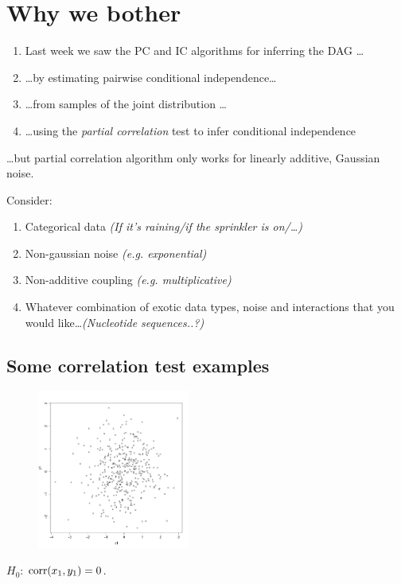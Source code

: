 \clearpage

\section{Why we bother}

\begin{enumerate}
	\item Last week we saw the PC and IC algorithms for inferring the DAG \ldots 
	\item \ldots by estimating pairwise conditional independence\ldots
	\item \ldots from samples of the joint distribution \ldots
	\item \ldots using the \emph{partial correlation} test to infer conditional independence
\end{enumerate}
\clearpage
\dots but partial correlation algorithm only works for linearly additive, Gaussian noise.
\clearpage

Consider:
\begin{enumerate}
\item Categorical data \emph{(If it's raining/if the sprinkler is on/\ldots)}
\item Non-gaussian noise \emph{(e.g. exponential)}
\item Non-additive coupling \emph{(e.g. multiplicative)}
\item Whatever combination of exotic data types, noise and interactions that you would like\dots \emph{(Nucleotide sequences..?)}
\end{enumerate}
\clearpage
\subsection*{Some correlation test examples}
\clearpage
\begin{figure}
  \begin{center}
    \includegraphics[width=5cm]{x1_vs_y1.pdf}
  \end{center}
\end{figure}
$H_0$: $\operatorname*{corr}(x_1, y_1)=0$.

